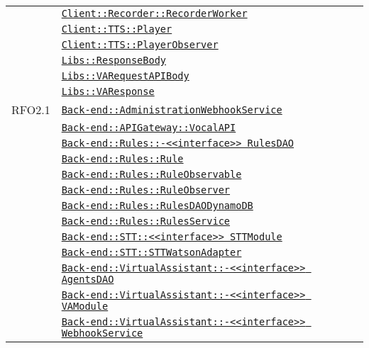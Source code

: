 \begin{longtable}{|>{\centering}m{3cm}|m{10cm}<{\centering}|}
& \hyperref[Client::Recorder::RecorderWorker]{\texttt{Client::Recorder::RecorderWorker}}\\
& \hyperref[Client::TTS::Player]{\texttt{Client::TTS::Player}}\\
& \hyperref[Client::TTS::PlayerObserver]{\texttt{Client::TTS::PlayerObserver}}\\
& \hyperref[Libs::ResponseBody]{\texttt{Libs::ResponseBody}}\\
& \hyperref[Libs::VARequestAPIBody]{\texttt{Libs::VARequestAPIBody}}\\
& \hyperref[Libs::VAResponse]{\texttt{Libs::VAResponse}}\\ \hline

RFO2.1 & \hyperref[Back-end::AdministrationWebhookService]{\texttt{Back-end::AdministrationWebhookService}}\\
& \hyperref[Back-end::APIGateway::VocalAPI]{\texttt{Back-end::APIGateway::VocalAPI}}\\
& \hyperref[Back-end::Rules::<<interface>> RulesDAO]{\texttt{Back-end::Rules::-\linebreak <<interface>> RulesDAO}}\\
& \hyperref[Back-end::Rules::Rule]{\texttt{Back-end::Rules::Rule}}\\
& \hyperref[Back-end::Rules::RuleObservable]{\texttt{Back-end::Rules::RuleObservable}}\\
& \hyperref[Back-end::Rules::RuleObserver]{\texttt{Back-end::Rules::RuleObserver}}\\
& \hyperref[Back-end::Rules::RulesDAODynamoDB]{\texttt{Back-end::Rules::RulesDAODynamoDB}}\\
& \hyperref[Back-end::Rules::RulesService]{\texttt{Back-end::Rules::RulesService}}\\
& \hyperref[Back-end::STT::<<interface>> STTModule]{\texttt{Back-end::STT::<<interface>> STTModule}}\\
& \hyperref[Back-end::STT::STTWatsonAdapter]{\texttt{Back-end::STT::STTWatsonAdapter}}\\
& \hyperref[Back-end::VirtualAssistant::<<interface>> AgentsDAO]{\texttt{Back-end::VirtualAssistant::-\linebreak <<interface>> AgentsDAO}}\\
& \hyperref[Back-end::VirtualAssistant::<<interface>> VAModule]{\texttt{Back-end::VirtualAssistant::-\linebreak <<interface>> VAModule}}\\
& \hyperref[Back-end::VirtualAssistant::<<interface>> WebhookService]{\texttt{Back-end::VirtualAssistant::-\linebreak <<interface>> WebhookService}}\\

\end{longtable}
